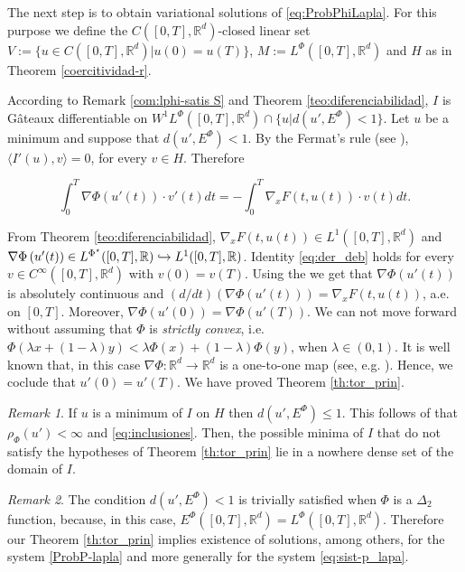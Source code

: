 \documentclass[twoside]{article}
\theoremstyle{remark}
\newtheorem{comentario}{Remark}
\newcommand{\lphi}{L^{\Phi}}
\newcommand{\lpsi}{L^{\Phi^{\star}}}
\newcommand{\ephi}{E^{\Phi}}
\newcommand{\wphi}{W^{1}\lphi}
\newcommand{\rr}{\mathbb{R}}
\renewcommand{\leq}{\leqslant}
\begin{document}
The next step is to obtain variational solutions of  \eqref{eq:ProbPhiLapla}. For this purpose we define the $C([0,T],\rr^d)$-closed linear set $V:=\{u\in C([0,T],\rr^d)|u(0)=u(T)\}$, $M:=\lphi([0,T],\rr^d)$ and $H$ as in Theorem \ref{coercitividad-r}.


According to Remark \ref{com:lphi-satis S} and Theorem \ref{teo:diferenciabilidad}, $I$ is G\^ateaux differentiable on $\wphi([0,T],\rr^d)\cap\{u| d(u',\ephi)<1\}$. Let $u$ be a minimum and suppose that  $d(u',\ephi)<1$. By the Fermat's rule (see \cite[Prop. 4.12]{clarke2013functional}), $\langle I'(u),v\rangle=0$, for every $v\in H$. Therefore

\begin{equation}\label{eq:der_deb}\int_0^T\nabla\Phi(u'(t))\cdot v'(t)dt=-\int_0^T \nabla_xF(t,u(t))\cdot v(t)dt.\end{equation}

From Theorem \ref{teo:diferenciabilidad}, $\nabla_xF(t,u(t))\in L^1([0,T],\rr^d)$ and  $\nabla\Phi\left(u'(t)\right)\in\linebreak\lpsi([0,T],\rr)\hookrightarrow L^1([0,T],\rr)$.  Identity \eqref{eq:der_deb} holds for every $v\in C^{\infty} ([0,T],\rr^d)$ with $v(0)=v(T)$. Using the \cite[Fundamental Lemma, p. 6]{mawhin2010critical} we get that $\nabla\Phi(u'(t))$ is absolutely continuous and $(d/dt)\left(\nabla\Phi(u'(t))\right) = \nabla_xF(t,u(t))$, a.e. on $[0,T]$. Moreover, $\nabla\Phi(u'(0))=\nabla\Phi(u'(T))$. We can not move forward without assuming that $\Phi$ is \emph{strictly convex}, i.e. $\Phi(\lambda x+(1-\lambda)y)<
\lambda \Phi(x)+(1-\lambda)\Phi(y)$, when $\lambda\in (0,1)$. 
It is  well known that, in this case $\nabla\Phi:\mathbb{R}^d\to\mathbb{R}^d$ is a one-to-one map  (see, e.g. \cite[Ex. 4.17, p. 67]{clarke2013functional}). Hence, we coclude that $u'(0)=u'(T)$.  We have proved Theorem \ref{th:tor_prin}.



\begin{comentario} If $u$ is a minimum of $I$ on $H$ then  $d(u',\ephi)\leq 1$. This follows of  that $\rho_{\Phi}(u')<\infty$ and \eqref{eq:inclusiones}. Then, the possible minima of $I$ that do not satisfy the hypotheses of  Theorem \ref{th:tor_prin} lie in a nowhere dense set of the domain of $I$.
 
\end{comentario}

\begin{comentario} The condition $d(u',\ephi)< 1$ is trivially satisfied when $\Phi$ is a $\Delta_2$ function, because, in this case, $\ephi([0,T],\rr^d)=\lphi([0,T],\rr^d)$. Therefore our Theorem \ref{th:tor_prin} implies existence of solutions, among others, for the system  \eqref{ProbP-lapla} and more generally for the system \eqref{eq:sist-p_lapa}. 
\end{comentario}
\end{document}
